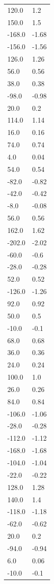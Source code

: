 \begin{longtable}{ll}
120.0 & 1.2 \\
150.0 & 1.5 \\
-168.0 & -1.68 \\
-156.0 & -1.56 \\
126.0 & 1.26 \\
56.0 & 0.56 \\
38.0 & 0.38 \\
-98.0 & -0.98 \\
20.0 & 0.2 \\
114.0 & 1.14 \\
16.0 & 0.16 \\
74.0 & 0.74 \\
4.0 & 0.04 \\
54.0 & 0.54 \\
-82.0 & -0.82 \\
-42.0 & -0.42 \\
-8.0 & -0.08 \\
56.0 & 0.56 \\
162.0 & 1.62 \\
-202.0 & -2.02 \\
-60.0 & -0.6 \\
-28.0 & -0.28 \\
52.0 & 0.52 \\
-126.0 & -1.26 \\
92.0 & 0.92 \\
50.0 & 0.5 \\
-10.0 & -0.1 \\
68.0 & 0.68 \\
36.0 & 0.36 \\
24.0 & 0.24 \\
100.0 & 1.0 \\
26.0 & 0.26 \\
84.0 & 0.84 \\
-106.0 & -1.06 \\
-28.0 & -0.28 \\
-112.0 & -1.12 \\
-168.0 & -1.68 \\
-104.0 & -1.04 \\
-22.0 & -0.22 \\
128.0 & 1.28 \\
140.0 & 1.4 \\
-118.0 & -1.18 \\
-62.0 & -0.62 \\
20.0 & 0.2 \\
-94.0 & -0.94 \\
6.0 & 0.06 \\
-10.0 & -0.1 \\

\end{longtable}

